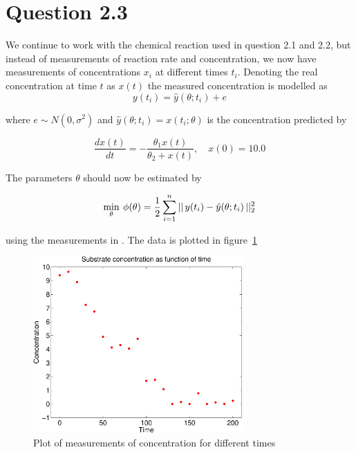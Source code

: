 \section*{Question 2.3}


We continue to work with the chemical reaction used in question 2.1 and 2.2, but instead of measurements of reaction rate and concentration, we now have measurements of concentrations $x_i$ at different times $t_i$. Denoting the real concentration at time $t$ as $x(t)$ the measured concentration is modelled as
\begin{equation*}
    y(t_i) = \hat{y}(\theta; t_i) + e
\end{equation*}

where $e\sim N(0, \sigma^2)$ and $\hat{y}(\theta; t_i)=x(t_i; \theta)$ is the concentration predicted by

\begin{equation}\label{eq:ex23-ode}
    \frac{dx(t)}{dt} = -\frac{\theta_1 x(t)}{\theta_2 + x(t)}, \quad x(0) = 10.0
\end{equation}

The parameters $\theta$ should now be estimated by

\begin{equation}\label{eq:ex23-min}
    \min_\theta\:\phi(\theta) = \frac{1}{2}\sum_{i=1}^n ||\,y(t_i) - \hat{y}(\theta;t_i)\,||^2_2
\end{equation}

using the measurements in . The data is plotted in figure~\ref{fig:ex23-data}

\begin{figure}[ht]
    \centering
    \includegraphics[width=80mm]{../media/ex23-data.pdf}
    \caption{Plot of measurements of concentration for different times}
    \label{fig:ex23-data}
\end{figure}

